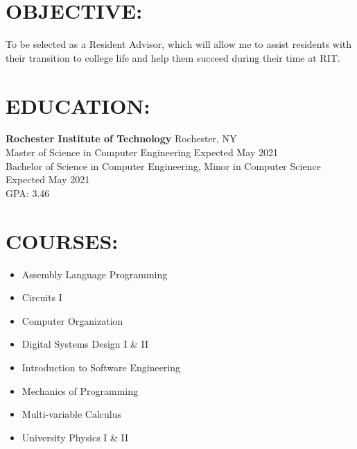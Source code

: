 \documentclass[line,margin]{res}
\begin{document}
\setlength\columnsep{-30pt}
\email{} %
\phone{} %
\address{} %
\address{} %
\website{} %

\begin{resume}
 \setlength
 \multicolsep{2pt}

\section{OBJECTIVE:} %
	To be selected as a Resident Advisor, which will allow me to assist residents with their transition to college life and help them succeed during their time at RIT.
\vspace{-2pt}
\section{EDUCATION:} 
	\textbf{Rochester Institute of Technology} \hfill Rochester, NY \\
	Master of Science in Computer Engineering \hfill Expected May 2021 \\
	Bachelor of Science in Computer Engineering, Minor in Computer Science \hfill Expected May 2021\\ 
	GPA: 3.46
\vspace{-2pt}

\section{COURSES:}
		\begin{multicols}{2}
		\setlength\columnsep{1pt}
			\begin{itemize}
				\setlength{\itemindent}{-25pt}
				\item[] Assembly Language Programming
				\item[] Circuits I
				\item[] Computer Organization
				\item[] Digital Systems Design I \& II
				\item[] \hspace{12.5pt} Introduction to Software Engineering
				\item[] \hspace{12.5pt} Mechanics of Programming
				\item[] \hspace{12.5pt} Multi-variable Calculus
				\item[] \hspace{12.5pt} University Physics I \& II
			\end{itemize}
		\end{multicols}
\vspace{-2pt}

\end{resume}
\end{document}
